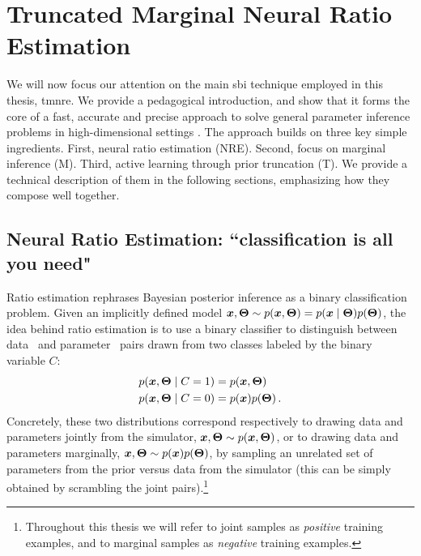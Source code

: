 \section{Truncated Marginal Neural Ratio Estimation} \label{sec:tmnre}

We will now focus our attention on the main \gls*{sbi} technique employed in this thesis, \gls*{tmnre}. We provide a pedagogical introduction, and show that it forms the core of a fast, accurate and precise approach to solve general parameter inference problems in high-dimensional settings \cite{Miller:2020hua, Miller:2021aa, Miller:2022shs}. The approach builds on three key simple ingredients. First, neural ratio estimation (NRE). Second, focus on marginal inference (M).  Third, active learning through prior truncation (T).  We provide a technical description of them in the following sections, emphasizing how they compose well together.

\subsection{Neural Ratio Estimation: ``classification is all you need"} \label{subsec:tmnre-nre}

Ratio estimation rephrases Bayesian posterior inference as a binary classification problem.
Given an implicitly defined model $\bm{x}, \bm{\Theta} \sim p(\bm{x}, \bm{\Theta}) = p(\bm{x}\mid\bm{\Theta})p(\bm{\Theta})$, the idea behind ratio estimation is to use a binary classifier to distinguish between data \data\ and parameter \param\ pairs  drawn from two classes labeled by the binary variable $C$:
\begin{align}
    p(\bm{x}, \bm{\Theta}  \mid C = 1) &= p(\bm{x}, \bm{\Theta} ) \\
    p(\bm{x}, \bm{\Theta}  \mid C = 0) &= p(\bm{x}) p(\bm{\Theta} ) \, .
\end{align}
Concretely, these two distributions correspond respectively to drawing data and parameters jointly from the simulator, $\bm{x}, \bm{\Theta} \sim p(\bm{x}, \bm{\Theta})$, or to drawing data and parameters marginally, $\bm{x}, \bm{\Theta} \sim p(\bm{x}) p(\bm{\Theta})$, by sampling an unrelated set of parameters from the prior versus data from the simulator (this can be simply obtained by scrambling the joint pairs).\footnote{Throughout this thesis we will refer to joint samples as \emph{positive} training examples, and to marginal samples as \emph{negative} training examples.} 

